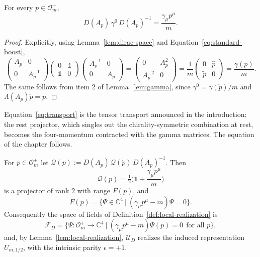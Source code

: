 	\begin{proposition}\label{prop:transport}
		For every $p\in\mathcal{O}_m^+$,
		\begin{equation}\label{eq:transport}
			D(A_p)\,\gamma^0\,D(A_p)^{-1}=\frac{\gamma_\mu p^\mu}{m}.
		\end{equation}
	\end{proposition}
	
	\begin{proof}
		Explicitly, using Lemma~\ref{lem:dirac-space} and Equation~\eqref{eq:standard-boost},
		\begin{equation*}
			\begin{pmatrix}A_p&0\\0&A_p^{-1}\end{pmatrix}\begin{pmatrix}0&\mathbb{1}\\\mathbb{1}&0\end{pmatrix}\begin{pmatrix}A_p^{-1}&0\\0&A_p\end{pmatrix}=\begin{pmatrix}0&A_p^2\\A_p^{-2}&0\end{pmatrix}=\frac1m\begin{pmatrix}0&\hat{p}\\\tilde{p}&0\end{pmatrix}=\frac{\gamma(p)}{m}.
		\end{equation*}
		The same follows from item 2 of Lemma~\ref{lem:gamma}, since $\gamma^0=\gamma(\mathring{p})/m$ and $\Lambda(A_p)\mathring{p}=p$.
	\end{proof}
	
	Equation~\eqref{eq:transport} is the tensor transport announced in the introduction: the rest projector, which singles out the chirality-symmetric combination at rest, becomes the four-momentum contracted with the gamma matrices. The equation of the chapter follows.
	
	\begin{theorem}\label{thm:dirac}
		For $p\in\mathcal{O}_m^+$ let $\mathcal{Q}(p):=D(A_p)\,\mathcal{Q}(\mathring{p})\,D(A_p)^{-1}$. Then
		\begin{equation}\label{eq:covariant-projector}
			\mathcal{Q}(p)=\tfrac12\Big(\mathbb{1}+\frac{\gamma_\mu p^\mu}{m}\Big)
		\end{equation}
		is a projector of rank $2$ with range $F(p)$, and
		\begin{equation}\label{eq:dirac-momentum}
			F(p)=\big\{\Psi\in\mathbb{C}^4\ \big|\ (\gamma_\mu p^\mu-m)\Psi=0\big\}.
		\end{equation}
		Consequently the space of fields of Definition~\ref{def:local-realization} is
		\begin{equation*}
			\mathcal{F}_D=\big\{\Psi:\mathcal{O}_m^+\to\mathbb{C}^4\ \big|\ (\gamma_\mu p^\mu-m)\Psi(p)=0\ \ \text{for all }p\big\},
		\end{equation*}
		and, by Lemma~\ref{lem:local-realization}, $\mathcal{U}_D$ realizes the induced representation $U_{m,1/2}$, with the intrinsic parity $\epsilon=+1$.
	\end{theorem}
	
